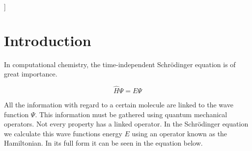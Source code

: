 \documentclass[twoside,twocolumn,9pt]{article}
\begin{document}
]

\renewcommand*\rmdefault{bch}\normalfont\upshape
\rmfamily
\section*{}
\vspace{-1cm}










\section{Introduction}

\paragraph*{}
In computational chemistry, the time-independent Schrödinger equation is of great importance.

\begin{equation}\label{eq:erwin}
  \hat{H}\Psi = E\Psi
\end{equation}

All the information with regard to a certain molecule are linked to the wave function $\Psi$.
This information must be gathered using quantum mechanical operators. Not every property has a linked operator. In the Schrödinger equation we
calculate this wave functions energy $E$ using an operator known as the Hamiltonian. In its full form it can be seen in the equation below\cite{Szabo1996}.
\end{document}
